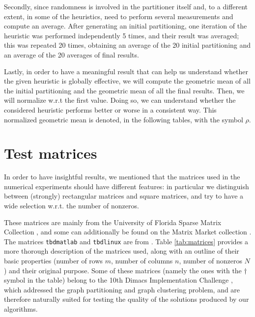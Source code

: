 Secondly, since randomness is involved in the partitioner itself and, to a different extent, in some of the heuristics, need to perform several measurements and compute an average. After generating an initial partitioning, one iteration of the heuristic was performed independently 5 times, and their result was averaged; this was repeated 20 times, obtaining an average of the 20 initial partitioning and an average of the 20 averages of final results. 

Lastly, in order to have a meaningful result that can help us understand whether the given heuristic is globally effective, we will compute the geometric mean of all the initial partitioning and the geometric mean of all the final results. Then, we will normalize w.r.t the first value. Doing so, we can understand whether the considered heuristic performs better or worse in a consistent way. This normalized geometric mean is denoted, in the following tables, with the symbol $\rho$.

\section{Test matrices} \label{sec:test_matrices}

In order to have insightful results, we mentioned that the matrices used in the numerical experiments should have different features: in particular we distinguish between (strongly) rectangular matrices and square matrices, and try to have a wide selection w.r.t. the number of nonzeros. 

These matrices are mainly from the University of Florida Sparse Matrix Collection \cite{ufl}, and some can additionally be found on the Matrix Market collection \cite{matrixmarket}. The matrices \verb|tbdmatlab| and \verb|tbdlinux| are from \cite{mondriaan}. Table \ref{tab:matrices} provides a more thorough description of the matrices used, along with an outline of their basic properties (number of rows $m$, number of columns $n$, number of nonzeros $N$) and their original purpose. Some of these matrices (namely the ones with the $\dagger$ symbol in the table) belong to the 10th Dimacs Implementation Challenge \cite{dimacs}, which addressed the graph partitioning and graph clustering problem, and are therefore naturally suited for testing the quality of the solutions produced by our algorithms.

